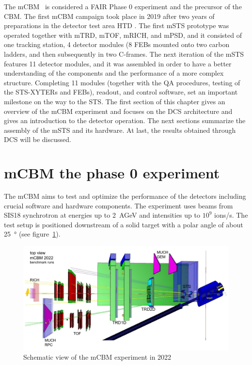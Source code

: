 The mCBM~\cite{mCBM} is considered a FAIR Phase 0 experiment and the precursor of the \gls{CBM}. The first mCBM campaign took place in 2019 after two years of preparations in the detector test area HTD \cite{progress_report_2017_sturm}. The first \gls{mSTS} prototype was operated together with mTRD, mTOF, mRICH, and mPSD, and it consisted of one tracking station, 4 detector modules (8 \glspl{FEB} mounted onto two carbon ladders, and then subsequently in two C-frames. The next iteration of the \gls{mSTS} features 11 detector modules, and it was assembled in order to have a better understanding of the components and the performance of a more complex structure. Completing 11 modules (together with the QA procedures, testing of the \gls{STS}-XYTERs and \gls{FEB}s), readout, and control software, set an important milestone on the way to the \gls{STS}. The first section of this chapter gives an overview of the mCBM experiment and focuses on the \gls{DCS} architecture and gives an introduction to the detector operation. The next sections summarize the assembly of the \gls{mSTS} and its hardware. At last, the results obtained through \gls{DCS} will be discussed. 

\section{mCBM the phase 0 experiment}
The mCBM aims to test and optimize the performance of the detectors including crucial software and hardware components. The experiment uses beams from SIS18 synchrotron at energies up to 2~AGeV and intensities up to $10^{9}$ ions/s. The test setup is positioned downstream of a solid target with a polar angle of about \SI{25}{\degree} (see figure~\ref{fig_mcbm}).

\begin{figure}[!h]
\centering
\includegraphics[width=0.7\columnwidth]{Chapter5/DCS/images/mcbm_2021_setup.png}
\caption{Schematic view of the mCBM experiment in 2022}
\label{fig_mcbm}
\end{figure}

